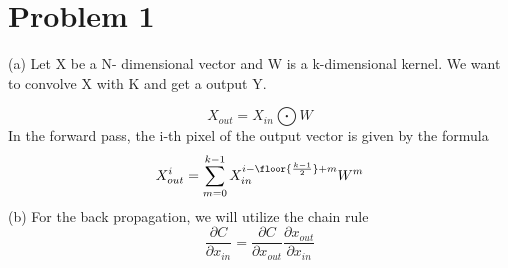 \documentclass[12pt,letterpaper]{article}
\begin{document}
	\section*{Problem  1 }
	(a) \newline
	Let X be a N- dimensional vector and W is a  k-dimensional kernel. We want to convolve X with K and get a output Y.
	
	\[X_{out}  = X_{in} \bigodot W  \]
	In the forward pass, the i-th pixel of the output vector is given by the formula
	\[
	X_{out}^{i} = \sum_{m = 0}^{k-1} X_{in}^{i -  \floor{\frac{k-1}{2}}+m}W^{m}
	\]
	(b) \newline
	For the back propagation, we will utilize the chain rule \newline
	\[
	\frac{\partial C}{\partial x_{in}} =  \frac{\partial C} {\partial x_{out}} \frac{\partial x_{out}}{\partial x_{in}}
	\]
\end{document}
